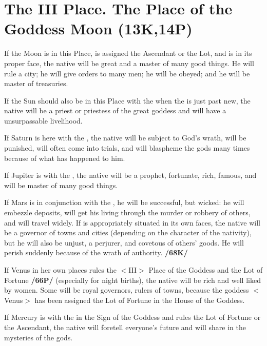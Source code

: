 \section{The III Place. The Place of the Goddess Moon (13K,14P)}

If the Moon is in this Place, is assigned the Ascendant or the Lot, and is in its proper face, the native will be great and a master of many good things. He will rule a city; he will give orders to many men; he will be obeyed; and he will be master of treasuries. 

If the Sun should also be in this Place with the \Moon\xspace when the \Moon\xspace is just past new, the native will be a priest or priestess of the great goddess and will have a unsurpassable livelihood. 

If Saturn is here with the \Moon, the native will be subject to God's wrath, will be punished, will often come into trials, and will blaspheme the gods many times because of what has happened to him. 

If Jupiter is with the \Moon, the native will be a prophet, fortunate, rich, famous, and will be master of many good things. 

If Mars is in conjunction with the \Moon, he will be successful, but wicked: he will embezzle deposits, will get his living through the murder or robbery of others, and will travel widely. If \Mars\xspace is appropriately situated in its own faces, the native will be a governor of towns and cities (depending on the character of the nativity), but he will also be unjust, a perjurer, and covetous of others’ goods. He will perish suddenly because of the wrath of authority. \textbf{/68K/} 

If Venus in her own places rules the $<$III$>$ Place of the Goddess and the Lot of Fortune \textbf{/66P/} (especially for night births), the native will be rich and well liked by women. Some will be royal governors, rulers of towns, because the goddess $<$Venus$>$ has been assigned the Lot of Fortune in the House of the Goddess. 

If Mercury is with the \Moon\xspace in the Sign of the Goddess and rules the Lot of Fortune or the Ascendant, the native will foretell everyone’s future and will share in the mysteries of the gods.

\newpage